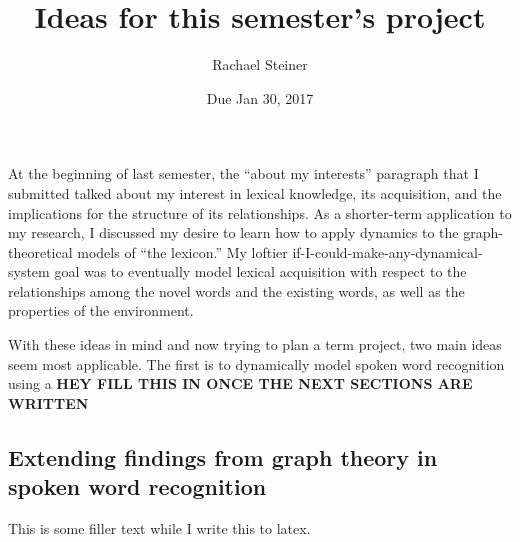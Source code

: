 \documentclass{article}
\title{Ideas for this semester's project}
\date{Due Jan 30, 2017}
\author{Rachael Steiner}
\begin{document}
\maketitle

At the beginning of last semester, the ``about my interests'' paragraph
that I submitted talked about my interest in lexical knowledge, its
acquisition, and the implications for the structure of its
relationships. As a shorter-term application to my research, I discussed
my desire to learn how to apply dynamics to the graph-theoretical models
of ``the lexicon.'' My loftier if-I-could-make-any-dynamical-system goal
was to eventually model lexical acquisition with respect to the
relationships among the novel words and the existing words, as well as
the properties of the environment.

With these ideas in mind and now trying to plan a term project, two main
ideas seem most applicable. The first is to dynamically model spoken
word recognition using a \textbf{HEY FILL THIS IN ONCE THE NEXT SECTIONS
ARE WRITTEN}

\subsection{Extending findings from graph theory in spoken word
recognition}\label{extending-findings-from-graph-theory-in-spoken-word-recognition}

This is some filler text while I write this to latex.
\end{document}
